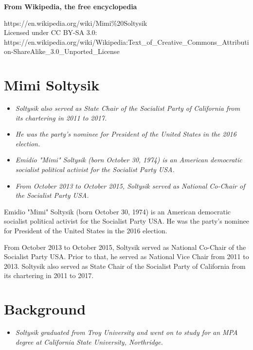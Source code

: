 \textbf{From Wikipedia, the free encyclopedia}

https://en.wikipedia.org/wiki/Mimi\%20Soltysik\\
Licensed under CC BY-SA 3.0:\\
https://en.wikipedia.org/wiki/Wikipedia:Text\_of\_Creative\_Commons\_Attribution-ShareAlike\_3.0\_Unported\_License

\section{Mimi Soltysik}\label{mimi-soltysik}

\begin{itemize}
\item
  \emph{Soltysik also served as State Chair of the Socialist Party of
  California from its chartering in 2011 to 2017.}
\item
  \emph{He was the party's nominee for President of the United States in
  the 2016 election.}
\item
  \emph{Emidio "Mimi" Soltysik (born October 30, 1974) is an American
  democratic socialist political activist for the Socialist Party USA.}
\item
  \emph{From October 2013 to October 2015, Soltysik served as National
  Co-Chair of the Socialist Party USA.}
\end{itemize}

Emidio "Mimi" Soltysik (born October 30, 1974) is an American democratic
socialist political activist for the Socialist Party USA. He was the
party's nominee for President of the United States in the 2016 election.

From October 2013 to October 2015, Soltysik served as National Co-Chair
of the Socialist Party USA. Prior to that, he served as National Vice
Chair from 2011 to 2013. Soltysik also served as State Chair of the
Socialist Party of California from its chartering in 2011 to 2017.

\section{Background}\label{background}

\begin{itemize}
\item
  \emph{Soltysik graduated from Troy University and went on to study for
  an MPA degree at California State University, Northridge.}
\end{itemize}

